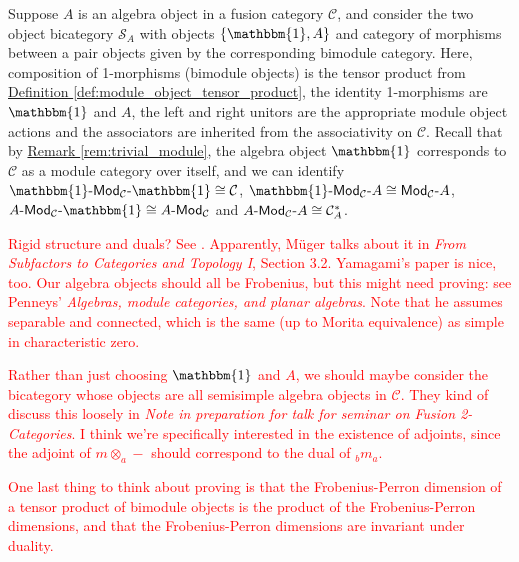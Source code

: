 \documentclass[12pt, reqno]{amsart}
\numberwithin{equation}{section}
\theoremstyle{plainspace}
\theoremstyle{definitionspace}
\theoremstyle{remarkspace}
\newcommand{\mathcat}[1]{\mathcal{#1}}
\newcommand{\textcat}[1]{\textup{\textsf{#1}}}
\newcommand{\rmodcat}[2][]{\textcat{Mod}_{#1}\textcat{-}#2}
\newcommand{\lmodcat}[2][]{#2\textcat{-Mod}_{#1}}
\newcommand{\bimodcat}[3][]{#2\textcat{-Mod}_{#1}\textcat{-}#3}
\begin{document}
\noindent Suppose $A$ is an algebra object in a fusion category $\mathcat{C}$, and consider the two object bicategory $\mathcat{S}_A$ with objects $\{\mathbbm{1}, A\}$ and category of morphisms between a pair objects given by the corresponding bimodule category. Here, composition of 1-morphisms (bimodule objects) is the tensor product from \hyperref[def:module_object_tensor_product]{Definition \ref*{def:module_object_tensor_product}}, the identity 1-morphisms are $\mathbbm{1}$ and $A$, the left and right unitors are the appropriate module object actions and the associators are inherited from the associativity on $\mathcat{C}$. Recall that by \hyperref[rem:trivial_module]{Remark \ref*{rem:trivial_module}}, the algebra object $\mathbbm{1}$ corresponds to $\mathcat{C}$ as a module category over itself, and we can identify $\bimodcat[\mathcat{C}]{\mathbbm{1}}{\mathbbm{1}} \cong \mathcat{C}$, $\bimodcat[\mathcat{C}]{\mathbbm{1}}{A} \cong \rmodcat[\mathcat{C}]{A}$, $\bimodcat[\mathcat{C}]{A}{\mathbbm{1}} \cong \lmodcat[\mathcat{C}]{A}$ and $\bimodcat[\mathcat{C}]{A}{A} \cong \mathcat{C}_A^{*}$.
\newline

\noindent \textcolor{red}{Rigid structure and duals? See \cite[Example 7.9.8]{Etingof_2016}. Apparently, M\"{u}ger talks about it in {\em From Subfactors to Categories and Topology I}, Section 3.2. Yamagami's paper is nice, too. Our algebra objects should all be Frobenius, but this might need proving: see Penneys' {\em Algebras, module categories, and planar algebras}. Note that he assumes separable and connected, which is the same (up to Morita equivalence) as simple in characteristic zero.}
\newline

\noindent \textcolor{red}{Rather than just choosing $\mathbbm{1}$ and $A$, we should maybe consider the bicategory whose objects are all semisimple algebra objects in $\mathcat{C}$. They kind of discuss this loosely in {\em Note in preparation for talk for seminar on Fusion 2-Categories}. I think we're specifically interested in the existence of adjoints, since the adjoint of $m \otimes_a -$ should correspond to the dual of ${_b}m_a$.}
\newline

\noindent \textcolor{red}{One last thing to think about proving is that the Frobenius-Perron dimension of a tensor product of bimodule objects is the product of the Frobenius-Perron dimensions, and that the Frobenius-Perron dimensions are invariant under duality.}
\newline\newline
\end{document}
